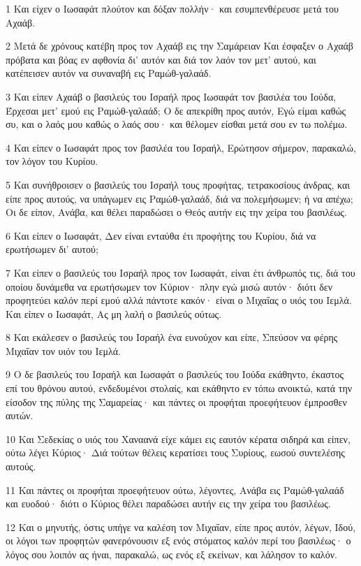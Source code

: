 \par 1 Και είχεν ο Ιωσαφάτ πλούτον και δόξαν πολλήν· και εσυμπενθέρευσε μετά του Αχαάβ.
\par 2 Μετά δε χρόνους κατέβη προς τον Αχαάβ εις την Σαμάρειαν Και έσφαξεν ο Αχαάβ πρόβατα και βόας εν αφθονία δι' αυτόν και διά τον λαόν τον μετ' αυτού, και κατέπεισεν αυτόν να συναναβή εις Ραμώθ-γαλαάδ.
\par 3 Και είπεν Αχαάβ ο βασιλεύς του Ισραήλ προς Ιωσαφάτ τον βασιλέα του Ιούδα, Έρχεσαι μετ' εμού εις Ραμώθ-γαλαάδ; Ο δε απεκρίθη προς αυτόν, Εγώ είμαι καθώς συ, και ο λαός μου καθώς ο λαός σου· και θέλομεν είσθαι μετά σου εν τω πολέμω.
\par 4 Και είπεν ο Ιωσαφάτ προς τον βασιλέα του Ισραήλ, Ερώτησον σήμερον, παρακαλώ, τον λόγον του Κυρίου.
\par 5 Και συνήθροισεν ο βασιλεύς του Ισραήλ τους προφήτας, τετρακοσίους άνδρας, και είπε προς αυτούς, να υπάγωμεν εις Ραμώθ-γαλαάδ, διά να πολεμήσωμεν; ή να απέχω; Οι δε είπον, Ανάβα, και θέλει παραδώσει ο Θεός αυτήν εις την χείρα του βασιλέως.
\par 6 Και είπεν ο Ιωσαφάτ, Δεν είναι ενταύθα έτι προφήτης του Κυρίου, διά να ερωτήσωμεν δι' αυτού;
\par 7 Και είπεν ο βασιλεύς του Ισραήλ προς τον Ιωσαφάτ, είναι έτι άνθρωπός τις, διά του οποίου δυνάμεθα να ερωτήσωμεν τον Κύριον· πλην εγώ μισώ αυτόν· διότι δεν προφητεύει καλόν περί εμού αλλά πάντοτε κακόν· είναι ο Μιχαΐας ο υιός του Ιεμλά. Και είπεν ο Ιωσαφάτ, Ας μη λαλή ο βασιλεύς ούτως.
\par 8 Και εκάλεσεν ο βασιλεύς του Ισραήλ ένα ευνούχον και είπε, Σπεύσον να φέρης Μιχαΐαν τον υιόν του Ιεμλά.
\par 9 Ο δε βασιλεύς του Ισραήλ και Ιωσαφάτ ο βασιλεύς του Ιούδα εκάθηντο, έκαστος επί του θρόνου αυτού, ενδεδυμένοι στολαίς, και εκάθηντο εν τόπω ανοικτώ, κατά την είσοδον της πύλης της Σαμαρείας· και πάντες οι προφήται προεφήτευον έμπροσθεν αυτών.
\par 10 Και Σεδεκίας ο υιός του Χαναανά είχε κάμει εις εαυτόν κέρατα σιδηρά και είπεν, ούτω λέγει Κύριος· Διά τούτων θέλεις κερατίσει τους Συρίους, εωσού συντελέσης αυτούς.
\par 11 Και πάντες οι προφήται προεφήτευον ούτω, λέγοντες, Ανάβα εις Ραμώθ-γαλαάδ και ευοδού· διότι ο Κύριος θέλει παραδώσει αυτήν εις την χείρα του βασιλέως.
\par 12 Και ο μηνυτής, όστις υπήγε να καλέση τον Μιχαΐαν, είπε προς αυτόν, λέγων, Ιδού, οι λόγοι των προφητών φανερόνουσιν εξ ενός στόματος καλόν περί του βασιλέως· ο λόγος σου λοιπόν ας ήναι, παρακαλώ, ως ενός εξ εκείνων, και λάλησον το καλόν.
